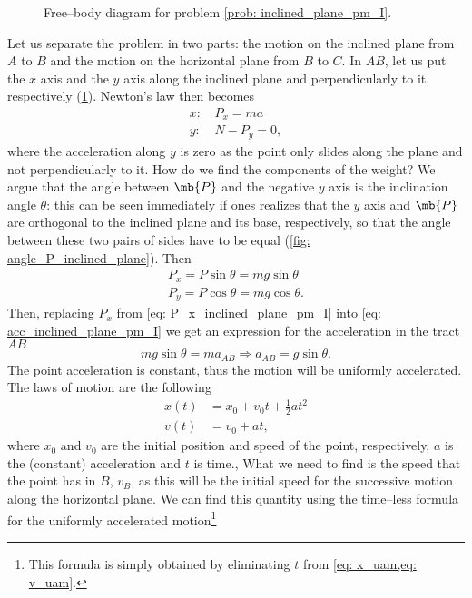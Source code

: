 \begin{description}
\begin{figure}
\begin{center}
\begin{tikzpicture}
            \end{tikzpicture}
        \end{center}
        \caption{Free--body diagram for problem \ref{prob: inclined_plane_pm_I}.}
        \label{fig: free_body_diagram_pm_I}
    \end{figure}
    Let us separate the problem in two parts: the motion on the inclined plane from $A$ to $B$ and the motion on the horizontal plane from $B$ to $C$. In $AB$, let us put the $x$ axis and the $y$ axis along the inclined plane and perpendicularly to it, respectively (\cref{fig: free_body_diagram_pm_I}). Newton's law then becomes
    \begin{align}
        x: \, & P_x = m a \label{eq: acc_inclined_plane_pm_I} \\
        y: \, & N - P_y = 0,
    \end{align} 
    where the acceleration along $y$ is zero as the point only slides along the plane and not perpendicularly to it. How do we find the components of the weight? We argue that the angle between $\mb{P}$ and the negative $y$ axis is the inclination angle $\theta$: this can be seen immediately if ones realizes that the $y$ axis and $\mb{P}$ are orthogonal to the inclined plane and its base, respectively, so that the angle between these two pairs of sides have to be equal (\cref{fig: angle_P_inclined_plane}). Then
    \begin{gather}
        P_x = P \sin \theta = mg \sin \theta \label{eq: P_x_inclined_plane_pm_I} \\
        P_y = P \cos \theta = mg \cos \theta.
    \end{gather}
    Then, replacing $P_x$ from \cref{eq: P_x_inclined_plane_pm_I} into \cref{eq: acc_inclined_plane_pm_I} we get an expression for the acceleration in the tract $AB$
    \begin{equation}
        mg \sin \theta = ma_{AB} \Rightarrow a_{AB} = g \sin \theta.
    \end{equation} 
    The point acceleration is constant, thus the motion will be uniformly accelerated. The laws of motion are the following
    \begin{align}
        x(t) & = x_0 + v_0 t + \frac{1}{2} a t^2 \label{eq: x_uam} \\
        v(t) & = v_0 + at \label{eq: v_uam},
    \end{align}
    where $x_0$ and $v_0$ are the initial position and speed of the point, respectively, $a$ is the (constant) acceleration and $t$ is time.,
    What we need to find is the speed that the point has in $B$, $v_B$, as this will be the initial speed for the successive motion along the horizontal plane. We can find this quantity using the time--less formula for the uniformly accelerated motion\footnote{This formula is simply obtained by eliminating $t$ from \cref{eq: x_uam,eq: v_uam}.}

\end{description}
